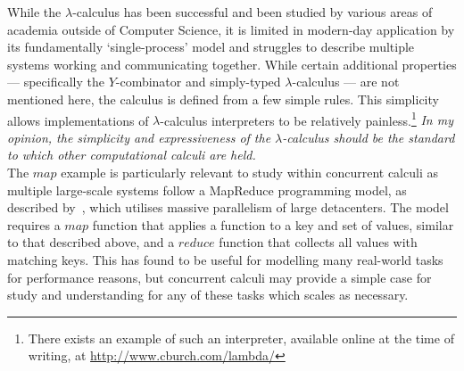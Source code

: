     
    \begin{remarks}
        While the $\lambda$-calculus has been successful and been studied by various areas of academia outside of Computer Science, it is limited in modern-day application by its fundamentally `single-process' model and struggles to describe multiple systems working and communicating together. 
        While certain additional properties --- specifically the $Y$-combinator and simply-typed $\lambda$-calculus --- are not mentioned here, the calculus is defined from a few simple rules.
        This simplicity allows implementations of $\lambda$-calculus interpreters to be relatively painless.\footnote{There exists an example of such an interpreter, available online at the time of writing, at \url{http://www.cburch.com/lambda/}}
        \textit{In my opinion, the simplicity and expressiveness of the $\lambda$-calculus should be the standard to which other computational calculi are held.}\\

        The ${map}$ example is particularly relevant to study within concurrent calculi as multiple large-scale systems follow a MapReduce programming model, as described by~\cite{mapreduce}, which utilises massive parallelism of large detacenters.
        The model requires a ${map}$ function that applies a function to a key and set of values, similar to that described above, and a ${reduce}$ function that collects all values with matching keys.
        This has found to be useful for modelling many real-world tasks for performance reasons, but concurrent calculi may provide a simple case for study and understanding for any of these tasks which scales as necessary.
    \end{remarks}
